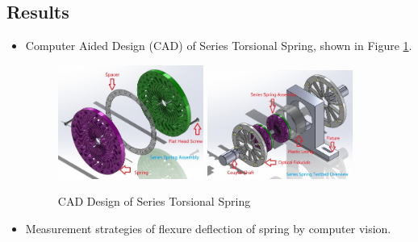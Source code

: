 \documentclass[12pt]{article}
\begin{document}
\subsection{Results}

\begin{itemize}
    \item {Computer Aided Design (CAD) of Series Torsional Spring, shown in Figure \ref*{Series Spring CAD}}. 
    
                
    \begin{figure}[H]

        \centering
        \includegraphics[width=0.45\textwidth]{portfolio/SeriesASSEM_2in1.JPG}
        \includegraphics[width=0.45\textwidth]{portfolio/SeriesASSEM_4in1.JPG}
        \caption{CAD Design of Series Torsional Spring}
        \label{Series Spring CAD}

    \end{figure}

    \item {Measurement strategies of flexure deflection of spring by computer vision.}

\end{itemize}




\newpage
\end{document}
